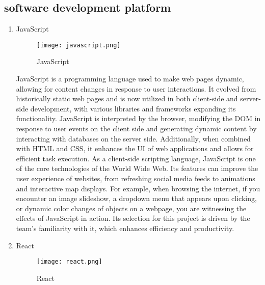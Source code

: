 \documentclass[conference]{IEEEtran}
\begin{document}
\subsection{software development platform}

\begin{enumerate}[itemsep=2ex, parsep=1ex]
	\item JavaScript
	      	      	              
	      \begin{figure}[h!]
	      	\centering
	      	\texttt{[image: javascript.png]}
	      	\caption{JavaScript}
	      	\label{fig:JavaScript}
	      \end{figure}
	      	      	      
	      JavaScript is a programming language used to make web pages dynamic, allowing
	      for content changes in response to user interactions. It evolved from
	      historically static web pages and is now utilized in both client-side and
	      server-side development, with various libraries and frameworks expanding its
	      functionality. JavaScript is interpreted by the browser, modifying the DOM
	      in response to user events on the client side and generating dynamic content
	      by interacting with databases on the server side. Additionally, when combined
	      with HTML and CSS, it enhances the UI of web applications and allows for
	      efficient task execution. As a client-side scripting language, JavaScript
	      is one of the core technologies of the World Wide Web. Its features can improve
	      the user experience of websites, from refreshing social media feeds to
	      animations and interactive map displays. For example, when browsing the
	      internet, if you encounter an image slideshow, a dropdown menu that
	      appears upon clicking, or dynamic color changes of objects on a webpage,
	      you are witnessing the effects of JavaScript in action. Its selection for this
	      project is driven by the team's familiarity with it, which enhances
	      efficiency and productivity.
	      	      
	      \vspace{5cm}
	      	      	      
	\item React
	      	      	      
	      \begin{figure}[h!]
	      	\centering
	      	\texttt{[image: react.png]}
	      	\caption{React}
	      	\label{fig:React}
	      \end{figure}
	      	      	      

\end{enumerate}
\end{document}
